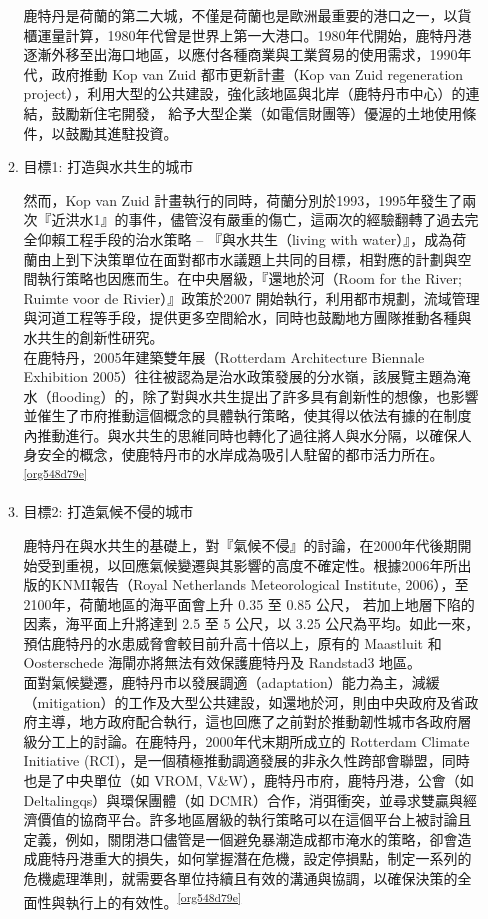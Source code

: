 \documentclass[a4paper,12pt]{article}
\begin{document}
\begin{enumerate}
\begin{enumerate}
鹿特丹是荷蘭的第二大城，不僅是荷蘭也是歐洲最重要的港口之一，以貨櫃運量計算，1980年代曾是世界上第一大港口。1980年代開始，鹿特丹港逐漸外移至出海口地區，以應付各種商業與工業貿易的使用需求，1990年代，政府推動 Kop van Zuid 都市更新計畫（Kop van Zuid regeneration project），利用大型的公共建設，強化該地區與北岸（鹿特丹市中心）的連結，鼓勵新住宅開發， 給予大型企業（如電信財團等）優渥的土地使用條件，以鼓勵其進駐投資。\\

\item 目標1: 打造與水共生的城市
\label{sec:orgf046c62}

然而，Kop van Zuid 計畫執行的同時，荷蘭分別於1993，1995年發生了兩次『近洪水1』的事件，儘管沒有嚴重的傷亡，這兩次的經驗翻轉了過去完全仰賴工程手段的治水策略 – 『與水共生（living with water）』，成為荷蘭由上到下決策單位在面對都市水議題上共同的目標，相對應的計劃與空間執行策略也因應而生。在中央層級，『還地於河（Room for the River; Ruimte voor de Rivier）』政策於2007 開始執行，利用都市規劃，流域管理與河道工程等手段，提供更多空間給水，同時也鼓勵地方團隊推動各種與水共生的創新性研究。\\

在鹿特丹，2005年建築雙年展（Rotterdam Architecture Biennale Exhibition 2005）往往被認為是治水政策發展的分水嶺，該展覽主題為淹水（flooding）的，除了對與水共生提出了許多具有創新性的想像，也影響並催生了市府推動這個概念的具體執行策略，使其得以依法有據的在制度內推動進行。與水共生的思維同時也轉化了過往將人與水分隔，以確保人身安全的概念，使鹿特丹市的水岸成為吸引人駐留的都市活力所在。\textsuperscript{\ref{org548d79e}}\\

\item 目標2: 打造氣候不侵的城市
\label{sec:orgc185b9d}

鹿特丹在與水共生的基礎上，對『氣候不侵』的討論，在2000年代後期開始受到重視，以回應氣候變遷與其影響的高度不確定性。根據2006年所出版的KNMI報告（Royal Netherlands Meteorological Institute, 2006），至2100年，荷蘭地區的海平面會上升 0.35 至 0.85 公尺， 若加上地層下陷的因素，海平面上升將達到 2.5 至 5 公尺，以 3.25 公尺為平均。如此一來， 預估鹿特丹的水患威脅會較目前升高十倍以上，原有的 Maastluit 和 Oosterschede 海閘亦將無法有效保護鹿特丹及 Randstad3 地區。\\

面對氣候變遷，鹿特丹市以發展調適（adaptation）能力為主，減緩（mitigation）的工作及大型公共建設，如還地於河，則由中央政府及省政府主導，地方政府配合執行，這也回應了之前對於推動韌性城市各政府層級分工上的討論。在鹿特丹，2000年代末期所成立的 Rotterdam Climate Initiative (RCI)，是一個積極推動調適發展的非永久性跨部會聯盟，同時也是了中央單位（如 VROM, V\&W），鹿特丹市府，鹿特丹港，公會（如Deltalingqs）與環保團體（如 DCMR）合作，消弭衝突，並尋求雙贏與經濟價值的協商平台。許多地區層級的執行策略可以在這個平台上被討論且定義，例如，關閉港口儘管是一個避免暴潮造成都市淹水的策略，卻會造成鹿特丹港重大的損失，如何掌握潛在危機，設定停損點，制定一系列的危機處理準則，就需要各單位持續且有效的溝通與協調，以確保決策的全面性與執行上的有效性。\textsuperscript{\ref{org548d79e}}\\


\end{enumerate}
\end{enumerate}
\end{document}
